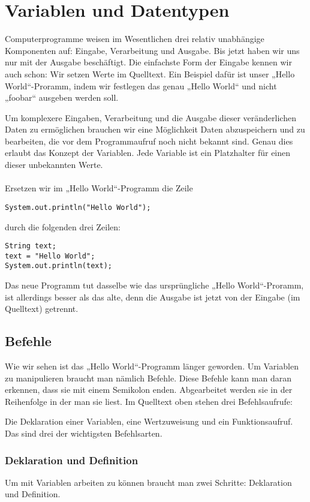 \chapter{Variablen und Datentypen}
Computerprogramme weisen im Wesentlichen drei relativ unabhängige Komponenten auf: Eingabe, Verarbeitung und Ausgabe. Bis jetzt haben wir uns nur mit der Ausgabe beschäftigt.
Die einfachste Form der Eingabe kennen wir auch schon: Wir setzen Werte im Quelltext. Ein Beispiel dafür ist unser „Hello World“-Proramm, indem wir festlegen das genau „Hello World“ und nicht „foobar“ ausgeben werden soll.

Um komplexere Eingaben, Verarbeitung und die Ausgabe dieser veränderlichen Daten zu ermöglichen brauchen wir eine Möglichkeit Daten abzuspeichern und zu bearbeiten, die vor dem Programmaufruf noch nicht bekannt sind.
Genau dies erlaubt das Konzept der Variablen. Jede Variable ist ein Platzhalter für einen dieser unbekannten Werte. \\ \\
Ersetzen wir im „Hello World“-Programm die Zeile
\begin{lstlisting}
System.out.println("Hello World");
\end{lstlisting}
durch die folgenden drei Zeilen:
\begin{lstlisting}
String text;
text = "Hello World";
System.out.println(text);
\end{lstlisting}

Das neue Programm tut dasselbe wie das ursprüngliche „Hello World“-Proramm, ist allerdings besser als das alte, denn die Ausgabe ist jetzt von der Eingabe (im Quelltext) getrennt.

\section {Befehle}
Wie wir sehen ist das „Hello World“-Programm länger geworden. Um Variablen zu manipulieren braucht man nämlich Befehle. Diese Befehle kann man daran erkennen, dass sie mit einem Semikolon enden. Abgearbeitet werden sie in der Reihenfolge in der man sie liest. Im Quelltext oben stehen drei Befehlsaufrufe:

Die Deklaration einer Variablen, eine Wertzuweisung und ein Funktionsaufruf. Das sind drei der wichtigsten Befehlsarten.

\subsection {Deklaration und Definition}
Um mit Variablen arbeiten zu können braucht man zwei Schritte: Deklaration und Definition.

